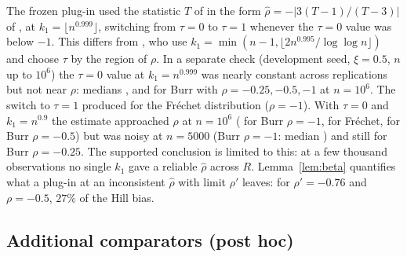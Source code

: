 \documentclass[11pt]{article}
\theoremstyle{definition}
\theoremstyle{remark}
\numberwithin{equation}{section}
\begin{document}
The frozen plug-in used the statistic $T$ of \citet{fagh2003} in the form $\hat\rho=-|3(T-1)/(T-3)|$ of \citet{cgp2005}, at $k_1=\lfloor n^{0.999}\rfloor$, switching from $\tau=0$ to $\tau=1$ whenever the $\tau=0$ value was below $-1$. This differs from \citet{cgp2005}, who use $k_1=\min(n-1,\lfloor2n^{0.995}/\log\log n\rfloor)$ and choose $\tau$ by the region of $\rho$. In a separate check (development seed, $\xi=0.5$, $n$ up to $10^6$) the $\tau=0$ value at $k_1=n^{0.999}$ was nearly constant across replications but not near $\rho$: medians \rhoNineNineNineBurrA, \rhoNineNineNineBurrB{} and \rhoNineNineNineBurrC{} for Burr with $\rho=-0.25,-0.5,-1$ at $n=10^6$. The switch to $\tau=1$ produced \rhoFrechetSwitch{} for the Fr\'echet distribution ($\rho=-1$). With $\tau=0$ and $k_1=n^{0.9}$ the estimate approached $\rho$ at $n=10^6$ (\rhoNineBurrC{} for Burr $\rho=-1$, \rhoNineFrechet{} for Fr\'echet, \rhoNineBurrB{} for Burr $\rho=-0.5$) but was noisy at $n=5000$ (Burr $\rho=-1$: median \rhoNineBurrCsmall) and still \rhoNineBurrA{} for Burr $\rho=-0.25$. The supported conclusion is limited to this: at a few thousand observations no single $k_1$ gave a reliable $\hat\rho$ across $R$. Lemma~\ref{lem:beta} quantifies what a plug-in at an inconsistent $\hat\rho$ with limit $\rho'$ leaves: for $\rho'=-0.76$ and $\rho=-0.5$, $27\%$ of the Hill bias.

\subsection{Additional comparators (post hoc)}\label{sec:comparators}
\end{document}

